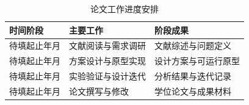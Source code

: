 \begin{table}[htbp]
  \caption{论文工作进度安排}
  \label{tab:schedule}
  \centering
  \fontsize{11bp}{14bp}\selectfont
  \renewcommand{\arraystretch}{1.45}
  \begin{tabularx}{\linewidth}{@{}p{24mm}XY@{}}
    \toprule
    时间阶段 & 主要工作 & 阶段成果 \\
    \midrule
    待填起止年月 & 文献阅读与需求调研 & 文献综述与问题定义 \\
    待填起止年月 & 方案设计与原型实现 & 设计方案与可运行原型 \\
    待填起止年月 & 实验验证与设计迭代 & 分析结果与迭代记录 \\
    待填起止年月 & 论文撰写与修改 & 学位论文与成果材料 \\
    \bottomrule
  \end{tabularx}
\end{table}
